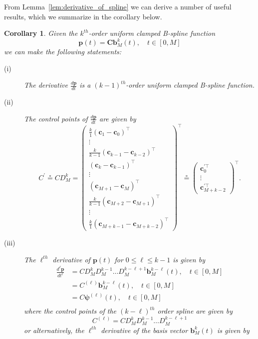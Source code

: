\documentclass{article}
\newtheorem{corollary}[theorem]{Corollary}
\newcommand{\defeq}{\circeq}
\newcommand{\bbf}{\mathbf{b}}
\newcommand{\cbf}{\mathbf{c}}
\newcommand{\Cbf}{\mathbf{C}}
\begin{document}
From Lemma~\ref{lem:derivative_of_spline} we can derive a number of useful results, which we summarize in the corollary below.
\begin{corollary}
	Given the $k^{th}$-order uniform clamped B-spline function
	\[
	\mathbf{p}(t) = \Cbf \bbf_M^k(t), \quad t\in[0, M]
	\]
	we can make the following statements:
	\begin{description}
	\item[(i)] The derivative  $\frac{d\mathbf{p}}{dt}$ is a $(k-1)^{th}$-order uniform clamped B-spline function.
	\item[(ii)] The control points of $\frac{d\mathbf{p}}{dt}$ are given by
		\[
		C^{'} \defeq C D_M^k = \begin{pmatrix}
				\frac{k}{1} (\cbf_1 - \cbf_0)^\top \\
				\vdots \\
				\frac{k}{k-1} (\cbf_{k-1} - \cbf_{k-2})^\top \\
				(\cbf_k - \cbf_{k-1})^\top \\
				\vdots \\
				(\cbf_{M+1} - \cbf_{M})^\top \\
				\frac{k}{k-1} (\cbf_{M+2}-\cbf_{M+1})^\top \\
				\vdots \\
				\frac{k}{1} (\cbf_{M+k-1} - \cbf_{M+k-2})^\top
 				\end{pmatrix}^\top
 			\defeq \begin{pmatrix}
 			        \cbf_0^{'\top} \\
 			        \vdots \\
 			        \cbf_{M+k-2}^{'\top}
 				   \end{pmatrix}^\top.
		\]
	\item[(iii)] The $\ell^{th}$ derivative of $\mathbf{p}(t)$ for $0\leq\ell\leq k-1$ is given by
		\begin{align*}
			\frac{d^{\ell}\mathbf{p}}{dt^{\ell}} 
			&= C D_M^k D_M^{k-1} \dots D_M^{k-\ell+1} \bbf_M^{k-\ell}(t), \quad t\in [0, M] \\
			&= C^{(\ell)} \bbf_M^{k-\ell}(t), \quad t\in [0, M] \\
			&= C \boldsymbol{\psi}^{(\ell)}(t), \quad t\in [0, M] \\
		\end{align*}
		where the control points of the $(k-\ell)^{th}$ order spline are given by
		\[
			C^{(\ell)} = C D_M^k D_M^{k-1} \dots D_M^{k-\ell+1}
		\]
		or alternatively, the $\ell^{th}$ derivative of the basis vector $\bbf_M^k(t)$ is given by
		\[
\]
\end{description}
\end{corollary}
\end{document}
